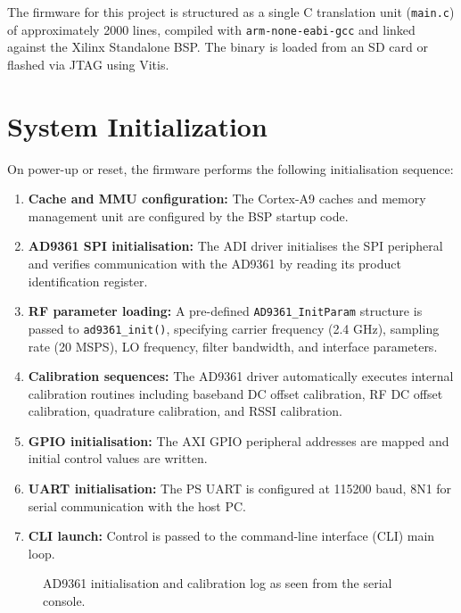 \documentclass[12pt, a4paper, oneside]{report}
\begin{document}
The firmware for this project is structured as a single C translation unit (\texttt{main.c}) of approximately 2000 lines, compiled with \texttt{arm-none-eabi-gcc} and linked against the Xilinx Standalone BSP. The binary is loaded from an SD card or flashed via JTAG using Vitis.

\section{System Initialization}

On power-up or reset, the firmware performs the following initialisation sequence:

\begin{enumerate}[noitemsep]
  \item \textbf{Cache and MMU configuration:} The Cortex-A9 caches and memory management unit are configured by the BSP startup code.
  \item \textbf{AD9361 SPI initialisation:} The ADI driver initialises the SPI peripheral and verifies communication with the AD9361 by reading its product identification register.
  \item \textbf{RF parameter loading:} A pre-defined \texttt{AD9361\_InitParam} structure is passed to \texttt{ad9361\_init()}, specifying carrier frequency (2.4 GHz), sampling rate (20 MSPS), LO frequency, filter bandwidth, and interface parameters.
  \item \textbf{Calibration sequences:} The AD9361 driver automatically executes internal calibration routines including baseband DC offset calibration, RF DC offset calibration, quadrature calibration, and RSSI calibration.
  \item \textbf{GPIO initialisation:} The AXI GPIO peripheral addresses are mapped and initial control values are written.
  \item \textbf{UART initialisation:} The PS UART is configured at 115200 baud, 8N1 for serial communication with the host PC.
  \item \textbf{CLI launch:} Control is passed to the command-line interface (CLI) main loop.
\end{enumerate}

\begin{figure}[H]
  \centering
  \caption{AD9361 initialisation and calibration log as seen from the serial console.}
  \label{fig:init_log}
\end{figure}
\end{document}
